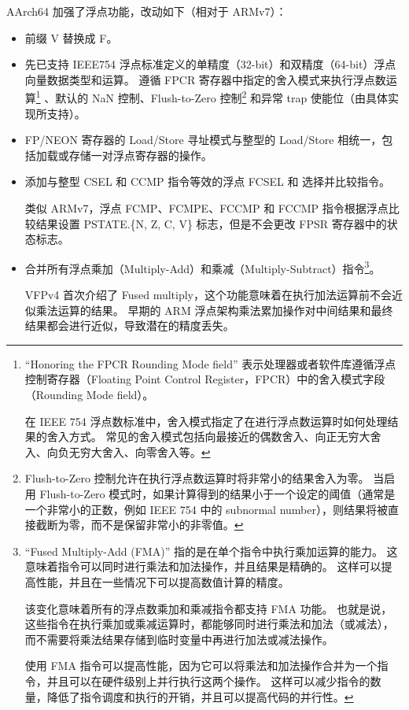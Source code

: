 AArch64 加强了浮点功能，改动如下（相对于 ARMv7）：

\begin{itemize}
  \item 前缀 V 替换成 F。
  \item 先已支持 IEEE754 浮点标准定义的单精度（32-bit）和双精度（64-bit）浮点向量数据类型和运算。
    遵循 FPCR 寄存器中指定的舍入模式来执行浮点数运算\footnote{
      “Honoring the FPCR Rounding Mode field” 表示处理器或者软件库遵循浮点控制寄存器（Floating Point Control Register，FPCR）中的舍入模式字段（Rounding Mode field）。

      在 IEEE 754 浮点数标准中，舍入模式指定了在进行浮点数运算时如何处理结果的舍入方式。
      常见的舍入模式包括向最接近的偶数舍入、向正无穷大舍入、向负无穷大舍入、向零舍入等。
    }
    、默认的 NaN 控制、Flush-to-Zero 控制\footnote{
      Flush-to-Zero 控制允许在执行浮点数运算时将非常小的结果舍入为零。
      当启用 Flush-to-Zero 模式时，如果计算得到的结果小于一个设定的阈值（通常是一个非常小的正数，例如 IEEE 754 中的 subnormal number），则结果将被直接截断为零，而不是保留非常小的非零值。
    }
    和异常 trap 使能位（由具体实现所支持）。
  \item FP/NEON 寄存器的 Load/Store 寻址模式与整型的 Load/Store 相统一，包括加载或存储一对浮点寄存器的操作。
  \item 添加与整型 CSEL 和 CCMP 指令等效的浮点 FCSEL 和 选择并比较指令。

    类似 ARMv7，浮点 FCMP、FCMPE、FCCMP 和 FCCMP 指令根据浮点比较结果设置 PSTATE.\{N, Z, C, V\} 标志，但是不会更改 FPSR 寄存器中的状态标志。
  \item 合并所有浮点乘加（Multiply-Add）和乘减（Multiply-Subtract）指令\footnote{
      “Fused Multiply-Add (FMA)” 指的是在单个指令中执行乘加运算的能力。
      这意味着指令可以同时进行乘法和加法操作，并且结果是精确的。
      这样可以提高性能，并且在一些情况下可以提高数值计算的精度。

      该变化意味着所有的浮点数乘加和乘减指令都支持 FMA 功能。
      也就是说，这些指令在执行乘加或乘减运算时，都能够同时进行乘法和加法（或减法），而不需要将乘法结果存储到临时变量中再进行加法或减法操作。

      使用 FMA 指令可以提高性能，因为它可以将乘法和加法操作合并为一个指令，并且可以在硬件级别上并行执行这两个操作。
      这样可以减少指令的数量，降低了指令调度和执行的开销，并且可以提高代码的并行性。
    }。

    VFPv4 首次介绍了 Fused multiply，这个功能意味着在执行加法运算前不会近似乘法运算的结果。
    早期的 ARM 浮点架构乘法累加操作对中间结果和最终结果都会进行近似，导致潜在的精度丢失。


\end{itemize}
